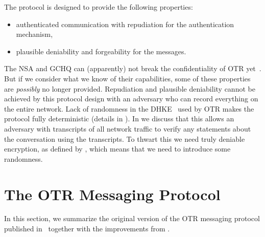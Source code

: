\begin{frame}
The protocol is designed to provide the following properties:
\begin{itemize}
    \pause{}
  \item authenticated communication with repudiation for the authentication 
    mechanism,
    \pause{}
  \item plausible deniability and forgeability for the messages.
\end{itemize}
\end{frame}
The \ac{NSA} and \ac{GCHQ} can (apparently) not break the confidentiality of 
\ac{OTR} yet~\cite{spiegelotr}.
But if we consider what we know of their capabilities, some of these properties 
are \emph{possibly} no longer provided.
Repudiation and plausible deniability cannot be achieved by this protocol 
design with an adversary who can record everything on the entire network.
Lack of randomness in the \ac{DHKE}~\cite{dh} used by \ac{OTR} makes 
the protocol fully deterministic (details in ).
In  we discuss that this allows an adversary with 
transcripts of all network traffic to verify any statements about the 
conversation using the transcripts.
To thwart this we need truly deniable encryption, as defined by 
\citet{deniablecrypt}, which means that we need to introduce some randomness.


\section[\acl{OTR}]{The \acs{OTR} Messaging Protocol}
\label{sec:otr}

In this section, we summarize the original version of the \ac{OTR} messaging 
protocol published in~\cite{otr2004} together with the improvements from 
\cite{di2005secure}.


